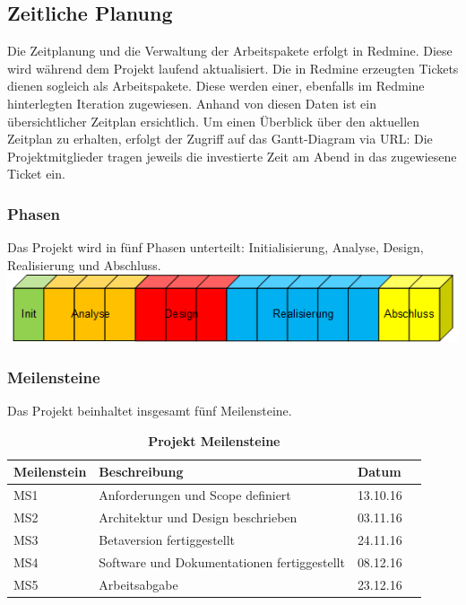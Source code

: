 \documentclass[a4,12pt]{scrartcl}
\begin{document}
\subsection{Zeitliche Planung}
Die Zeitplanung und die Verwaltung der Arbeitspakete erfolgt in Redmine. Diese wird während dem Projekt laufend aktualisiert. Die in Redmine erzeugten Tickets dienen sogleich als Arbeitspakete. Diese werden einer, ebenfalls im Redmine hinterlegten Iteration zugewiesen. Anhand von diesen Daten ist ein übersichtlicher Zeitplan ersichtlich. Um einen Überblick über den aktuellen Zeitplan zu erhalten, erfolgt der Zugriff auf das Gantt-Diagram via URL:
Die Projektmitglieder tragen jeweils die investierte Zeit am Abend in das zugewiesene Ticket ein. 

\subsubsection{Phasen}
Das Projekt wird in fünf Phasen unterteilt: Initialisierung, Analyse, Design, Realisierung und Abschluss.
\newline
\newline
\includegraphics[width=1\textwidth]{figures/phasen.png}
\newpage

\subsubsection{Meilensteine}
Das Projekt beinhaltet insgesamt fünf Meilensteine. \\
\begin{table}[H]
    \begin{tabular}{@{} l l l r@{}}\toprule    
    {Meilenstein} & {Beschreibung} & {Datum}\\ \midrule
    MS1 & Anforderungen und Scope definiert  & 13.10.16\\ \addlinespace
    MS2 & Architektur und Design beschrieben & 03.11.16\\ \addlinespace
    MS3 & Betaversion fertiggestellt  & 24.11.16\\ \addlinespace
    MS4 & Software und Dokumentationen fertiggestellt  & 08.12.16\\ \addlinespace
    MS5 & Arbeitsabgabe & 23.12.16\\ 
    \bottomrule
    \end{tabular}
\caption{\textbf{Projekt Meilensteine}}
\end{table}
\end{document}
